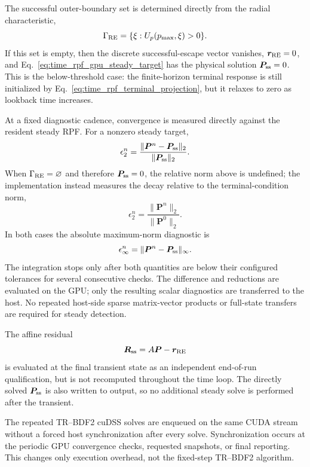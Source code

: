 \documentclass[11pt]{article}
\begin{document}
The successful outer-boundary set is determined directly from the radial characteristic,
\begin{equation}
 \Gamma_{\rm RE}=\{\xi:U_p(p_{\max},\xi)>0\}.
\end{equation}
If this set is empty, then the discrete successful-escape vector vanishes,
$\bm r_{\rm RE}=0$, and Eq.~\eqref{eq:time_rpf_gpu_steady_target} has the physical solution
$\bm P_{\rm ss}=0$.  This is the below-threshold case: the finite-horizon terminal response is
still initialized by Eq.~\eqref{eq:time_rpf_terminal_projection}, but it relaxes to zero as
lookback time increases.

At a fixed diagnostic cadence, convergence is measured directly against the resident steady
RPF.  For a nonzero steady target,
\begin{equation}
 \epsilon_2^n
 =\frac{\|\bm P^n-\bm P_{\rm ss}\|_2}{\|\bm P_{\rm ss}\|_2}.
 \label{eq:time_rpf_steady_match_l2}
\end{equation}
When $\Gamma_{\rm RE}=\varnothing$ and therefore $\bm P_{\rm ss}=0$, the relative norm above is
undefined; the implementation instead measures the decay relative to the terminal-condition
norm,
\begin{equation}
 \epsilon_2^n
 =\frac{\|\bm P^n\|_2}{\|\bm P^{0}\|_2}.
 \label{eq:time_rpf_zero_target_decay_l2}
\end{equation}
In both cases the absolute maximum-norm diagnostic is
\begin{equation}
 \epsilon_\infty^n=\|\bm P^n-\bm P_{\rm ss}\|_\infty .
 \label{eq:time_rpf_steady_match_linf}
\end{equation}
The integration stops only after both quantities are below their configured tolerances for
several consecutive checks.  The difference and reductions are evaluated on the GPU; only the
resulting scalar diagnostics are transferred to the host.  No repeated host-side sparse
matrix-vector products or full-state transfers are required for steady detection.

The affine residual
\begin{equation}
 \bm R_{\rm ss}=A\bm P-\bm r_{\rm RE}
 \label{eq:time_rpf_steady_residual}
\end{equation}
is evaluated at the final transient state as an independent end-of-run qualification, but is
not recomputed throughout the time loop.  The directly solved $\bm P_{\rm ss}$ is also written
to output, so no additional steady solve is performed after the transient.

The repeated TR--BDF2 cuDSS solves are enqueued on the same CUDA stream without a forced host
synchronization after every solve.  Synchronization occurs at the periodic GPU convergence
checks, requested snapshots, or final reporting.  This changes only execution overhead, not
the fixed-step TR--BDF2 algorithm.
\end{document}
